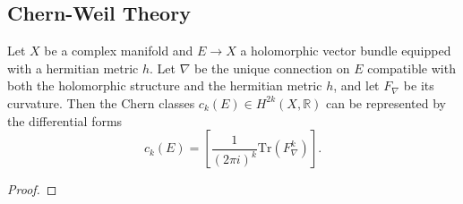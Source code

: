\subsection{Chern-Weil Theory}








\begin{theorem}\label{thm:Chern-Weil_theorem}
	Let \(X\) be a complex manifold and \(E \to X\) a holomorphic vector bundle equipped with a hermitian metric \(h\).
	Let \(\nabla\) be the unique connection on \(E\) compatible with both the holomorphic structure and the hermitian metric \(h\), and let \(F_\nabla\) be its curvature.
	Then the Chern classes \(c_k(E) \in H^{2k}(X, \mathbb{R})\) can be represented by the differential forms
	\[c_k(E) = \left[\frac{1}{(2\pi i)^k} \mathrm{Tr} \left( F_\nabla^k \right) \right].\]
\end{theorem}
\begin{proof}
\end{proof}




